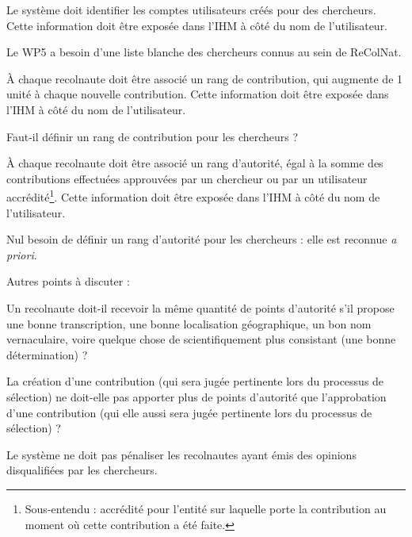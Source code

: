 \startsubsection[title={Représentation des contributeurs}]

\startsubsubsection[title={Compte scientifique & rang contributif}]

\exig{}
Le système doit identifier les comptes utilisateurs créés pour des chercheurs.
Cette information doit être exposée dans l'IHM à côté du nom de l'utilisateur.

\idea{}
Le WP5 a besoin d'une liste blanche des chercheurs connus au sein de ReColNat.

\exig{}
À chaque recolnaute doit être associé un rang de contribution, qui augmente de 1 unité à chaque nouvelle contribution.
Cette information doit être exposée dans l'IHM à côté du nom de l'utilisateur.

\idea{}
Faut-il définir un rang de contribution pour les chercheurs ?

\exig{}
À chaque recolnaute doit être associé un rang d'autorité, égal à la somme des contributions effectuées approuvées par un chercheur ou par un utilisateur accrédité\footnote{Sous-entendu : accrédité pour l'entité sur laquelle porte la contribution au moment où cette contribution a été faite.}.
Cette information doit être exposée dans l'IHM à côté du nom de l'utilisateur.

\idea{}
Nul besoin de définir un rang d'autorité pour les chercheurs : elle est reconnue {\it a priori}.

\idea{}
Autres points à discuter :

\startitemize
	\item Un recolnaute doit-il recevoir la même quantité de points d'autorité s'il propose une bonne transcription, une bonne localisation géographique, un bon nom vernaculaire, voire quelque chose de scientifiquement plus consistant (une bonne détermination) ?
	\item La création d'une contribution (qui sera jugée pertinente lors du processus de sélection) ne doit-elle pas apporter plus de points d'autorité que l'approbation d'une contribution (qui elle aussi sera jugée pertinente lors du processus de sélection) ?
\stopitemize

\exig{}
Le système ne doit pas pénaliser les recolnautes ayant émis des opinions disqualifiées par les chercheurs.


